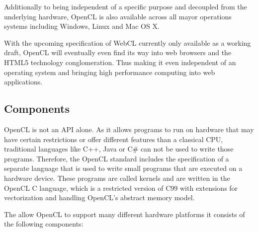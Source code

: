 Additionally to being independent of a specific purpose and decoupled from the underlying hardware, OpenCL is also available across all mayor operations systems including Windows, Linux and Mac OS X.

With the upcoming specification of WebCL currently only available as a working draft, OpenCL will eventually even find its way into web browsers and the HTML5 technology conglomeration. Thus making it even independent of an operating system and bringing high performance computing into web applications.

\subsection{Components}

OpenCL is not an API alone. As it allows programs to run on hardware that may have certain restrictions or offer different features than a classical CPU, traditional languages like C++, Java or C\# can not be used to write those programs. Therefore, the OpenCL standard includes the specification of a separate language that is used to write small programs that are executed on a hardware device. These programs are called kernels and are written in the OpenCL C language, which is a restricted version of C99 with extensions for vectorization and handling OpenCL's abstract memory model.

The allow OpenCL to support many different hardware platforms it consists of the following components:


